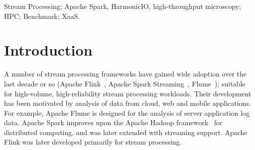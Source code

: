 \documentclass[conference]{IEEEtran}
\begin{document}


\begin{IEEEkeywords}Stream Processing; Apache Spark, HarmonicIO, high-throughput microscopy; HPC; Benchmark; XaaS.\end{IEEEkeywords} %

\section{Introduction}\label{intro}




A number of stream processing frameworks have gained wide adoption over the last decade or so (Apache Flink~\cite{carboneApacheFlinkStream2015}, Apache Spark Streaming~\cite{zahariaApacheSparkUnified2016}, Flume~\cite{apacheflumeApacheFlume2016}); suitable for high-volume, high-reliability stream processing workloads. Their development has been motivated by analysis of data from cloud, web and mobile applications. For example, Apache Flume is designed for the analysis of server application log data. Apache Spark improves upon the Apache Hadoop framework~\cite{ApacheHadoop2011} for distributed computing, and was later extended with streaming support. Apache Flink was later developed primarily for stream processing.
\end{document}
